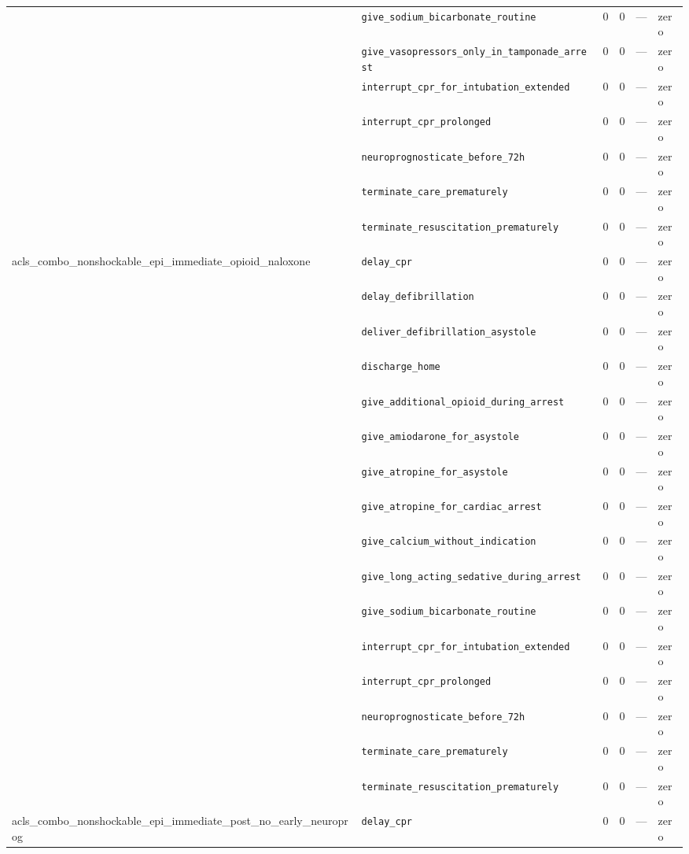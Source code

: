\begin{table}[ht]
\begin{tabular}{llrrrl}
 & \texttt{give\_sodium\_bicarbonate\_routine} & 0 & 0 & — & zero \\
 & \texttt{give\_vasopressors\_only\_in\_tamponade\_arrest} & 0 & 0 & — & zero \\
 & \texttt{interrupt\_cpr\_for\_intubation\_extended} & 0 & 0 & — & zero \\
 & \texttt{interrupt\_cpr\_prolonged} & 0 & 0 & — & zero \\
 & \texttt{neuroprognosticate\_before\_72h} & 0 & 0 & — & zero \\
 & \texttt{terminate\_care\_prematurely} & 0 & 0 & — & zero \\
 & \texttt{terminate\_resuscitation\_prematurely} & 0 & 0 & — & zero \\
\midrule
acls\_combo\_nonshockable\_epi\_immediate\_opioid\_naloxone & \texttt{delay\_cpr} & 0 & 0 & — & zero \\
 & \texttt{delay\_defibrillation} & 0 & 0 & — & zero \\
 & \texttt{deliver\_defibrillation\_asystole} & 0 & 0 & — & zero \\
 & \texttt{discharge\_home} & 0 & 0 & — & zero \\
 & \texttt{give\_additional\_opioid\_during\_arrest} & 0 & 0 & — & zero \\
 & \texttt{give\_amiodarone\_for\_asystole} & 0 & 0 & — & zero \\
 & \texttt{give\_atropine\_for\_asystole} & 0 & 0 & — & zero \\
 & \texttt{give\_atropine\_for\_cardiac\_arrest} & 0 & 0 & — & zero \\
 & \texttt{give\_calcium\_without\_indication} & 0 & 0 & — & zero \\
 & \texttt{give\_long\_acting\_sedative\_during\_arrest} & 0 & 0 & — & zero \\
 & \texttt{give\_sodium\_bicarbonate\_routine} & 0 & 0 & — & zero \\
 & \texttt{interrupt\_cpr\_for\_intubation\_extended} & 0 & 0 & — & zero \\
 & \texttt{interrupt\_cpr\_prolonged} & 0 & 0 & — & zero \\
 & \texttt{neuroprognosticate\_before\_72h} & 0 & 0 & — & zero \\
 & \texttt{terminate\_care\_prematurely} & 0 & 0 & — & zero \\
 & \texttt{terminate\_resuscitation\_prematurely} & 0 & 0 & — & zero \\
\midrule
acls\_combo\_nonshockable\_epi\_immediate\_post\_no\_early\_neuroprog & \texttt{delay\_cpr} & 0 & 0 & — & zero \\

\end{tabular}
\end{table}
